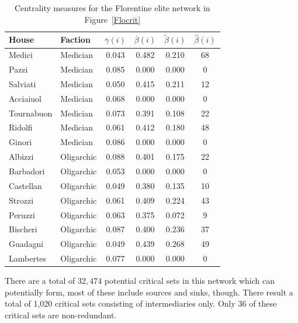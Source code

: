 \begin{table}[h]
\begin{center}
\begin{tabular}{llcccc}
\toprule
House & Faction & $\overline{\gamma} (i)$ & $\overline{\beta} (i)$ & $\widetilde{\beta} (i)$ & $\widehat{\beta} (i)$ \\
\midrule
Medici  & Medician   & 0.043  & 0.482  & 0.210  & 68  \\
Pazzi  & Medician  & 0.085  & 0.000  & 0.000 & 0   \\
Salviati  & Medician   & 0.050 	 & 0.415  & 0.211 & 12    \\
Acciaiuol   & Medician   & 0.068  & 0.000  & 0.000 & 0     \\
Tournabuon & Medician   & 0.073  & 0.391 & 0.108 & 22    \\
Ridolfi  & Medician   & 0.061 	& 0.412 & 0.180  & 48    \\
Ginori  & Medician   & 0.086  & 0.000  & 0.000 & 0     \\
Albizzi  & Oligarchic & 0.088  & 0.401 & 0.175  & 22    \\
Barbadori & Oligarchic & 0.053  & 0.000 & 0.000  & 0     \\
Castellan & Oligarchic & 0.049  & 0.380  & 0.135   & 10    \\
Strozzi & Oligarchic & 0.061 	& 0.409   & 0.224  & 43    \\
Peruzzi  & Oligarchic & 0.063 	 & 0.375  & 0.072  & 9     \\
Bischeri  & Oligarchic & 0.087  & 0.400 & 0.236  & 37    \\
Guadagni  & Oligarchic & 0.049  & 0.439  & 0.268 	 & 49    \\
Lambertes  & Oligarchic & 0.077  & 0.000  & 0.000  & 0   \\
\bottomrule
\end{tabular}
\end{center}
\caption{Centrality measures for the Florentine elite network in Figure~\ref{Flocrit}}
\end{table}

There are a total of $32,474$ potential critical sets in this network which can potentially form, most of these include sources and sinks, though. There result a total of 1,020 critical sets consisting of intermediaries only. Only 36 of these critical sets are non-redundant.

